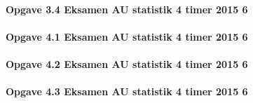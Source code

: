 \documentclass[]{book}
\let\oldparagraph\paragraph
\renewcommand{\paragraph}[1]{\oldparagraph{#1}\mbox{}}
\begin{document}
\hypertarget{opgave-3.4-eksamen-au-statistik-4-timer-2015-6}{%
\paragraph{Opgave 3.4 Eksamen AU statistik 4 timer 2015
6}\label{opgave-3.4-eksamen-au-statistik-4-timer-2015-6}}

\hypertarget{opgave-4.1-eksamen-au-statistik-4-timer-2015-6}{%
\paragraph{Opgave 4.1 Eksamen AU statistik 4 timer 2015
6}\label{opgave-4.1-eksamen-au-statistik-4-timer-2015-6}}

\hypertarget{opgave-4.2-eksamen-au-statistik-4-timer-2015-6}{%
\paragraph{Opgave 4.2 Eksamen AU statistik 4 timer 2015
6}\label{opgave-4.2-eksamen-au-statistik-4-timer-2015-6}}

\hypertarget{opgave-4.3-eksamen-au-statistik-4-timer-2015-6}{%
\paragraph{Opgave 4.3 Eksamen AU statistik 4 timer 2015
6}\label{opgave-4.3-eksamen-au-statistik-4-timer-2015-6}}


\end{document}
